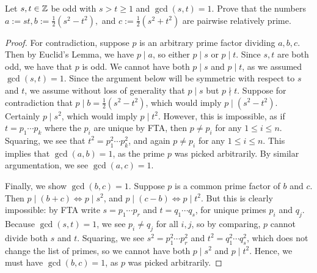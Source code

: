 \documentclass{article}
\begin{document}
\begin{exercise}[Chapter 7, \#3]
Let $s, t\in\mathbb Z$ be odd with $s>t\geq 1$ and $\gcd(s, t) = 1$. Prove that the numbers $a:= st, b:=\frac 12(s^2-t^2),$ and $c:=\frac 12(s^2+t^2)$ are pairwise relatively prime.
\end{exercise}
\begin{proof}
For contradiction, suppose $p$ is an arbitrary prime factor dividing $a, b,c$. Then by Euclid's Lemma, we have $p\mid a$, so either $p\mid s$ or $p\mid t$. Since $s,t$ are both odd, we have that $p$ is odd. We cannot have both $p\mid s$ and $p\mid t$, as we assumed $\gcd(s, t) = 1$. Since the argument below will be symmetric with respect to $s$ and $t$, we assume without loss of generality that $p\mid s$ but $p\nmid t$. Suppose for contradiction that $p\mid b = \frac 12(s^2-t^2)$, which would imply $p\mid(s^2-t^2)$. Certainly $p\mid s^2$, which would imply $p\mid t^2$. However, this is impossible, as if $t = p_1\cdots p_k$ where the $p_i$ are unique by FTA, then $p\neq p_i$ for any $1\leq i\leq n$. Squaring, we see that $t^2 = p_1^2\cdots p_k^2$, and again $p\neq p_i$ for any $1\leq i \leq n$. This implies that $\gcd(a,b) = 1$, as the prime $p$ was picked arbitrarily. By similar argumentation, we see $\gcd(a, c) = 1$.

Finally, we show $\gcd(b, c) = 1$. Suppose $p$ is a common prime factor of $b$ and $c$. Then $p\mid (b+c) \iff p \mid s^2$, and $p\mid (c-b) \iff p \mid t^2$. But this is clearly impossible: by FTA write $s = p_1\cdots p_r$ and $t = q_1\cdots q_s$, for unique primes $p_i$ and $q_j$. Because $\gcd(s,t) = 1$, we see $p_i\neq q_j$ for all $i,j$, so by comparing, $p$ cannot divide both $s$ and $t$. Squaring, we see $s^2 = p_1^2\cdots p_r^2$ and $t^2 = q_1^2\cdots q_s^2$, which does not change the list of primes, so we cannot have both $p\mid s^2$ and $p\mid t^2$. Hence, we must have $\gcd(b, c) = 1$, as $p$ was picked arbitrarily.
\end{proof}
\end{document}
